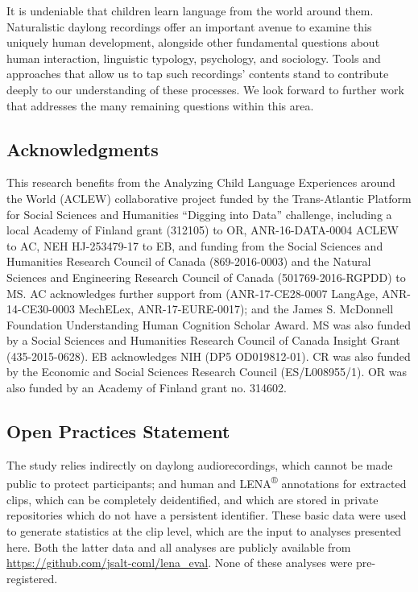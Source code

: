 \documentclass[english,table,man,floatsintext]{apa6}
\begin{document}
It is undeniable that children learn language from the world around them. Naturalistic daylong recordings offer an important avenue to examine this uniquely human development, alongside other fundamental questions about human interaction, linguistic typology, psychology, and sociology. Tools and approaches that allow us to tap such recordings' contents stand to contribute deeply to our understanding of these processes. We look forward to further work that addresses the many remaining questions within this area.

\hypertarget{acknowledgments}{%
\subsection{Acknowledgments}\label{acknowledgments}}

This research benefits from the Analyzing Child Language Experiences around the World (ACLEW) collaborative project funded by the Trans-Atlantic Platform for Social Sciences and Humanities \enquote{Digging into Data} challenge, including a local Academy of Finland grant (312105) to OR, ANR-16-DATA-0004 ACLEW to AC, NEH HJ-253479-17 to EB, and funding from the Social Sciences and Humanities Research Council of Canada (869-2016-0003) and the Natural Sciences and Engineering Research Council of Canada (501769-2016-RGPDD) to MS. AC acknowledges further support from (ANR-17-CE28-0007 LangAge, ANR-14-CE30-0003 MechELex, ANR-17-EURE-0017); and the James S. McDonnell Foundation Understanding Human Cognition Scholar Award. MS was also funded by a Social Sciences and Humanities Research Council of Canada Insight Grant (435-2015-0628). EB acknowledges NIH (DP5 OD019812-01). CR was also funded by the Economic and Social Sciences Research Council (ES/L008955/1). OR was also funded by an Academy of Finland grant no. 314602.

\hypertarget{open-practices-statement}{%
\subsection{Open Practices Statement}\label{open-practices-statement}}

The study relies indirectly on daylong audiorecordings, which cannot be made public to protect participants; and human and LENA\textsuperscript{®} annotations for extracted clips, which can be completely deidentified, and which are stored in private repositories which do not have a persistent identifier. These basic data were used to generate statistics at the clip level, which are the input to analyses presented here. Both the latter data and all analyses are publicly available from \url{https://github.com/jsalt-coml/lena_eval}. None of these analyses were pre-registered.
\end{document}
